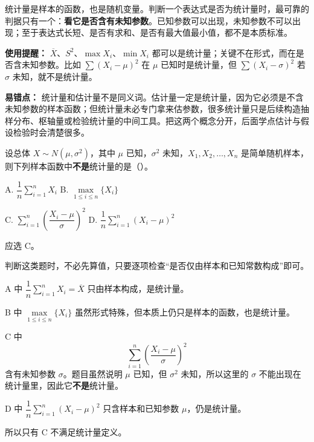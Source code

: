 ﻿\documentclass[lang=cn,11pt]{elegantbook}
\begin{document}
\begin{note}
统计量是样本的函数，也是随机变量。判断一个表达式是否为统计量时，最可靠的判据只有一个：\textbf{看它是否含有未知参数}。已知参数可以出现，未知参数不可以出现；至于表达式长短、是否有求和、是否有最大值最小值，都不是本质标准。
\end{note}

\begin{note}
\textbf{使用提醒：} \(\overline{X}\)、\(S^2\)、\(\max X_i\)、\(\min X_i\) 都可以是统计量；关键不在形式，而在是否含未知参数。比如 \(\sum (X_i-\mu)^2\) 在 \(\mu\) 已知时是统计量，但 \(\sum (X_i-\sigma)^2\) 若 \(\sigma\) 未知，就不是统计量。
\end{note}

\begin{note}
\textbf{易错点：} 统计量和估计量不是同义词。估计量一定是统计量，因为它必须是不含未知参数的样本函数；但统计量未必专门拿来估参数，很多统计量只是后续构造抽样分布、枢轴量或检验统计量的中间工具。把这两个概念分开，后面学点估计与假设检验时会清楚很多。
\end{note}

\begin{exercise}[统计量的判定] \label{ex:statistic_01}
设总体 \(X \sim N(\mu,\sigma^2)\)，其中 \(\mu\) 已知，\(\sigma^2\) 未知，\(X_1,X_2,\dots,X_n\) 是简单随机样本，则下列样本函数中\textbf{不是}统计量的是（\quad）。\par
A. \(\dfrac{1}{n}\displaystyle\sum_{i=1}^{n}X_i\)\qquad
B. \(\max\limits_{1\leq i\leq n}\{X_i\}\)\par
C. \(\displaystyle\sum_{i=1}^{n}\!\left(\dfrac{X_i-\mu}{\sigma}\right)^{\!2}\)\qquad
D. \(\dfrac{1}{n}\displaystyle\sum_{i=1}^{n}(X_i-\mu)^2\)
\end{exercise}
\begin{solution}
应选 C。

判断这类题时，不必先算值，只要逐项检查“是否仅由样本和已知常数构成”即可。

A 中 \(\dfrac{1}{n}\sum_{i=1}^{n}X_i=\overline{X}\) 只由样本构成，是统计量。

B 中 \(\max\limits_{1\le i\le n}\{X_i\}\) 虽然形式特殊，但本质上仍只是样本的函数，也是统计量。

C 中
\[
\sum_{i=1}^{n}\left(\frac{X_i-\mu}{\sigma}\right)^2
\]
含有未知参数 \(\sigma\)。题目虽然说明 \(\mu\) 已知，但 \(\sigma^2\) 未知，所以这里的 \(\sigma\) 不能出现在统计量里，因此它\textbf{不是}统计量。

D 中 \(\dfrac{1}{n}\sum_{i=1}^{n}(X_i-\mu)^2\) 只含样本和已知参数 \(\mu\)，仍是统计量。

所以只有 C 不满足统计量定义。
\end{solution}
\end{document}
